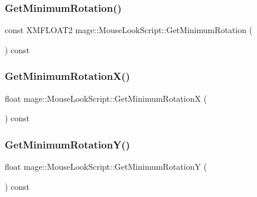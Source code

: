 \subsubsection{\texorpdfstring{Get\+Minimum\+Rotation()}{GetMinimumRotation()}}
{\footnotesize\ttfamily const X\+M\+F\+L\+O\+A\+T2 mage\+::\+Mouse\+Look\+Script\+::\+Get\+Minimum\+Rotation (\begin{DoxyParamCaption}{ }\end{DoxyParamCaption}) const}

\hypertarget{classmage_1_1_mouse_look_script_a6e1369c198e1d462f6fd30693f190d86}{}\label{classmage_1_1_mouse_look_script_a6e1369c198e1d462f6fd30693f190d86} 
\subsubsection{\texorpdfstring{Get\+Minimum\+Rotation\+X()}{GetMinimumRotationX()}}
{\footnotesize\ttfamily float mage\+::\+Mouse\+Look\+Script\+::\+Get\+Minimum\+RotationX (\begin{DoxyParamCaption}{ }\end{DoxyParamCaption}) const}

\hypertarget{classmage_1_1_mouse_look_script_a31f85ac897e436ebfff3d709b58eb435}{}\label{classmage_1_1_mouse_look_script_a31f85ac897e436ebfff3d709b58eb435} 
\subsubsection{\texorpdfstring{Get\+Minimum\+Rotation\+Y()}{GetMinimumRotationY()}}
{\footnotesize\ttfamily float mage\+::\+Mouse\+Look\+Script\+::\+Get\+Minimum\+RotationY (\begin{DoxyParamCaption}{ }\end{DoxyParamCaption}) const}

\hypertarget{classmage_1_1_mouse_look_script_ae7ca5fd8fcfa1fbe6654bae9abc0c5b7}{}\label{classmage_1_1_mouse_look_script_ae7ca5fd8fcfa1fbe6654bae9abc0c5b7} 
